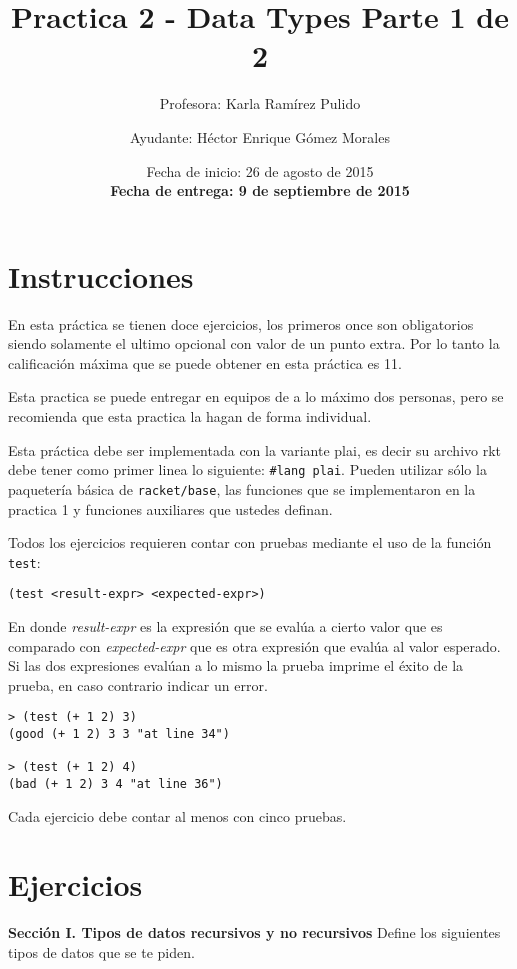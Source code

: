 \documentclass{article}
\author{Profesora: Karla Ramírez Pulido \and
  Ayudante: Héctor Enrique Gómez Morales}
\title{Practica 2 - Data Types Parte 1 de 2}
\date{Fecha de inicio: 26 de agosto de 2015\\
  \textbf{Fecha de entrega: 9 de septiembre de 2015}}
\begin{document}
\maketitle
\section{Instrucciones}
En esta práctica se tienen doce ejercicios, los primeros once son
obligatorios siendo solamente el ultimo opcional con valor de un
punto extra. Por lo tanto la calificación máxima que se puede obtener en
esta práctica es 11.

Esta practica se puede entregar en equipos de a lo máximo dos
personas, pero se recomienda que esta practica la hagan de forma
individual.

Esta práctica debe ser implementada con la variante plai, es decir
su archivo rkt debe tener como primer linea lo siguiente:
\texttt{\#lang plai}. Pueden utilizar sólo la paquetería básica de
\texttt{racket/base}, las funciones que se implementaron en la
practica 1 y funciones auxiliares que ustedes definan.

Todos los ejercicios requieren contar con pruebas mediante el uso de
la función \texttt{test}:
\begin{verbatim}
(test <result-expr> <expected-expr>)
\end{verbatim}

En donde \textit{result-expr} es la expresión que se evalúa a cierto
valor que es comparado con \textit{expected-expr} que es otra
expresión que evalúa al valor esperado. Si las dos expresiones evalúan
a lo mismo la prueba imprime el éxito de la prueba, en caso contrario
indicar un error.

\begin{verbatim}
> (test (+ 1 2) 3)
(good (+ 1 2) 3 3 "at line 34")

> (test (+ 1 2) 4)
(bad (+ 1 2) 3 4 "at line 36")
\end{verbatim}

Cada ejercicio debe contar al menos con cinco pruebas.

\section{Ejercicios}
\textbf{Sección I. Tipos de datos recursivos y no recursivos} Define
los siguientes tipos de datos que se te piden.
\end{document}
